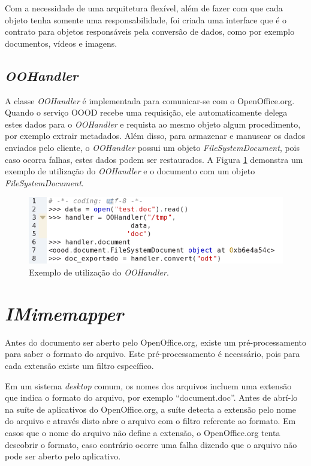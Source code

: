 Com a necessidade de uma arquitetura flexível, além de fazer com que cada objeto tenha somente uma responsabilidade, foi criada uma interface que é o contrato para objetos responsáveis pela conversão de dados, como por exemplo documentos, vídeos e imagens.

\subsection{\textit{OOHandler}}

A classe \textit{OOHandler} é implementada para comunicar-se com o OpenOffice.org. Quando o serviço OOOD recebe uma requisição, ele automaticamente delega estes dados para o \textit{OOHandler} e requista ao mesmo objeto algum procedimento, por exemplo extrair metadados. Além disso, para armazenar e manusear os dados enviados pelo cliente, o \textit{OOHandler} possui um objeto \textit{FileSystemDocument}, pois caso ocorra falhas, estes dados podem ser restaurados. A Figura \ref{fig:ex_oohandler} demonstra um exemplo de utilização do \textit{OOHandler} e o documento com um objeto \textit{FileSystemDocument}.

\begin{figure}[!ht]
\centering
\begin{center}
\includegraphics[scale=0.750,bb=0 10 500 106]{ex_oohandler.png}
\end{center}
\caption{Exemplo de utilização do \textit{OOHandler}.}
\label{fig:ex_oohandler}
\end{figure}

\section{\textit{IMimemapper}}

Antes do documento ser aberto pelo OpenOffice.org, existe um pré-processamento para saber o formato do arquivo. Este pré-processamento é necessário, pois para cada extensão existe um filtro específico. 

Em um sistema \textit{desktop} comum, os nomes dos arquivos incluem uma extensão que indica o formato do arquivo, por exemplo ``document.doc''. Antes de abrí-lo na suíte de aplicativos do OpenOffice.org, a suíte detecta a extensão pelo nome do arquivo e através disto abre o arquivo com o filtro referente ao formato. Em casos que o nome do arquivo não define a extensão, o OpenOffice.org tenta descobrir o formato, caso contrário ocorre uma falha dizendo que o arquivo não pode ser aberto pelo aplicativo.

